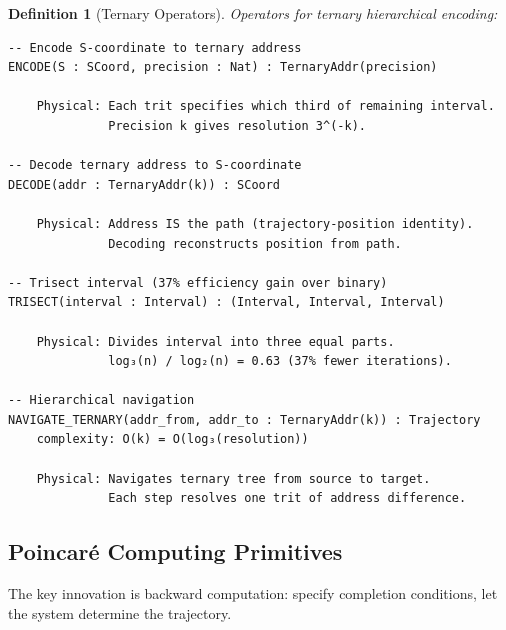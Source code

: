 \documentclass[aps,prd,twocolumn,superscriptaddress,floatfix,nofootinbib]{revtex4-2}
\newtheorem{definition}[theorem]{Definition}
\theoremstyle{remark}
\begin{document}
\begin{definition}[Ternary Operators]
\label{def:ternary_ops}
Operators for ternary hierarchical encoding:
\begin{verbatim}
-- Encode S-coordinate to ternary address
ENCODE(S : SCoord, precision : Nat) : TernaryAddr(precision)
    
    Physical: Each trit specifies which third of remaining interval.
              Precision k gives resolution 3^(-k).

-- Decode ternary address to S-coordinate
DECODE(addr : TernaryAddr(k)) : SCoord
    
    Physical: Address IS the path (trajectory-position identity).
              Decoding reconstructs position from path.

-- Trisect interval (37% efficiency gain over binary)
TRISECT(interval : Interval) : (Interval, Interval, Interval)
    
    Physical: Divides interval into three equal parts.
              log₃(n) / log₂(n) = 0.63 (37% fewer iterations).

-- Hierarchical navigation
NAVIGATE_TERNARY(addr_from, addr_to : TernaryAddr(k)) : Trajectory
    complexity: O(k) = O(log₃(resolution))
    
    Physical: Navigates ternary tree from source to target.
              Each step resolves one trit of address difference.
\end{verbatim}
\end{definition}

\subsection{Poincaré Computing Primitives}

The key innovation is backward computation: specify completion conditions, let the system determine the trajectory.
\end{document}
